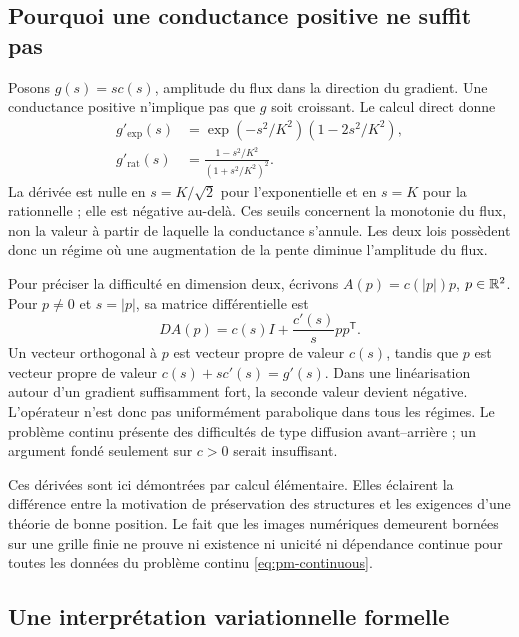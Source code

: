 \subsection{Pourquoi une conductance positive ne suffit pas}

Posons $g(s)=s c(s)$, amplitude du flux dans la direction du gradient.
Une conductance positive n'implique pas que $g$ soit croissant.
Le calcul direct donne
\begin{align}
 g'_{\mathrm{exp}}(s)
 &=\exp(-s^2/K^2)\left(1-2s^2/K^2\right),
 \label{eq:pm-flux-exp}\\
 g'_{\mathrm{rat}}(s)
 &=\frac{1-s^2/K^2}{(1+s^2/K^2)^2}.
 \label{eq:pm-flux-rat}
\end{align}
La dérivée est nulle en $s=K/\sqrt2$ pour l'exponentielle et en $s=K$
pour la rationnelle ; elle est négative au-delà. Ces seuils concernent
la monotonie du flux, non la valeur à partir de laquelle la conductance
s'annule. Les deux lois possèdent donc un régime où une augmentation
de la pente diminue l'amplitude du flux.

Pour préciser la difficulté en dimension deux, écrivons
$A(p)=c(|p|)p$, $p\in\mathbb{R}^2$. Pour $p\ne0$ et $s=|p|$, sa matrice
différentielle est
\begin{equation}
 D A(p)=c(s)I+\frac{c'(s)}{s}p p^{\mathsf T}.
 \label{eq:pm-jacobian}
\end{equation}
Un vecteur orthogonal à $p$ est vecteur propre de valeur $c(s)$,
tandis que $p$ est vecteur propre de valeur $c(s)+s c'(s)=g'(s)$.
Dans une linéarisation autour d'un gradient suffisamment fort,
la seconde valeur devient négative. L'opérateur n'est donc pas
uniformément parabolique dans tous les régimes. Le problème continu
présente des difficultés de type diffusion avant--arrière ; un
argument fondé seulement sur $c>0$ serait insuffisant.

Ces dérivées sont ici démontrées par calcul élémentaire. Elles
éclairent la différence entre la motivation de préservation des
structures et les exigences d'une théorie de bonne position. Le fait
que les images numériques demeurent bornées sur une grille finie ne
prouve ni existence ni unicité ni dépendance continue pour toutes
les données du problème continu \eqref{eq:pm-continuous}.

\subsection{Une interprétation variationnelle formelle}

